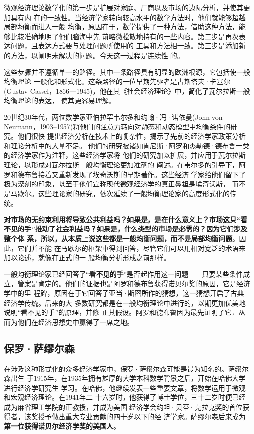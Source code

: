 微观经济理论数学化的第一步是扩展对家庭、厂商以及市场的边际分析，并使其更加具有内
在的一致性。当经济学家转向较高水平的数学方法时，他们就能够超越局部均衡而进入一般
均衡，原因在于，数学提供了一种方法，借助这种方法，能够比较准确地明了他们脑海中先
前略微松散地持有的一些内容。第二步是再次表达问题，且表达方式要与处理问题所使用的
工具和方法相一致。第三步是添加新的方法，以阐明未解决的问题。今天这一过程是连续性
的。

这些步骤并不遵循单一的路径。其中一条路径具有明显的欧洲根源，它包括使一般均衡理论
一般化和形式化。这条路径的一位早期先驱者是古斯塔夫·卡塞尔(Gustav
Cassel，1866一1945)，他在其《社会经济理论》中，简化了瓦尔拉斯一般均衡理论的表达，
使其更容易理解。

20世纪30年代，两位数学家亚伯拉罕韦尔多和约翰·冯·诺依曼(John von
Neumann，1903--1957)将他们的注意力转向对静态和动态模型中均衡条件的研究。他们很快
提出经济分析在技术上的复杂性，揭示了先前的经济学家政策分析和理论分析中的大量不足。
他们的研究被诸如肯尼斯·阿罗和杰勒德·德布鲁一类的经济学家作为注释，这些经济学家将
他们的研究加以扩展，并应用于瓦尔拉斯理论，以形成对瓦尔拉斯一般均衡理论更加准确的
阐述。在韦尔多的引导下，阿罗和德布鲁接着又重新发现了埃奇沃斯的早期著作。这些经济
学家给他们留下了极为深刻的印象，以至于他们宣称现代微观经济学的真正鼻祖是埃奇沃斯，
而不是马歇尔。这些理论家的研究，依次延续了一般均衡理论家的高度形式化的传
统。

\textbf{对市场的无约束利用将导致公共利益吗？如果是，是在什么意义上？市场这只“看
  不见的手”推动了社会利益吗？如果是，什么类型的市场是必需的？因为它们涉及整个体
  系，所以，从本质上说这些都是一般均衡问题，而不是局部均衡问题。}因此，它们并不能
在马歇尔的框架中得到回答，尽管它们可以用相对宽泛的术语来加以论述，就像在正式的一
般均衡分析形成之前那样。

一般均衡理论家已经回答了“\textbf{看不见的手}”是否起作用这一问题——只要某些条件成
立，管案是肯定的。他们的证据也是阿罗和德布鲁获得诺贝尔奖的原因，它是经济学中的里
程碑，原因在于它回答了亚当·斯密所作的猜想，这一猜想开启了古典经济学传统。后来的大
多数研究都是在一般均衡理论中进行的，以期更加优美地说明“看不见的手”的原理，并修
正其假设。阿罗和德布鲁因为最先证明了它，从而为他们在经济思想史中赢得了一席之地。

\subsection{保罗·萨缪尔森}

在涉及这种形式化的众多经济学家中，保罗·萨缪尔森可能是最为知名的。萨缪尔森出生
于1915年，在1935年拥有雄厚的大学本科数学背景之后，开始在哈佛大学进行经济学研究生
学习。在哈佛，他继续发表一些重要文章，将数学运用于微观和宏观经济理论。在1941年二
十六岁时，他获得了博士学位，三十二岁时便已经成为麻省理工学院的正教授，并成为美国
经济学会约坦·贝蒂·克拉克奖的首位获得者，该奖授予做出重大专业贡献的四十岁以下的经
济学家。萨缪尔森后来成为\textbf{第一位获得诺贝尔经济学奖的美国人}。

